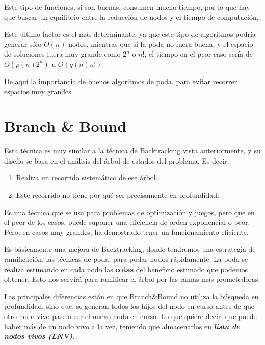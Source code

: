 \documentclass[10pt,a4paper,spanish]{report}
\theoremstyle{definition}
\theoremstyle{remark}
\begin{document}
Este tipo de funciones, si son buenas, consumen mucho tiempo, por lo que hay que buscar un equilibrio entre la reducción de nodos y el tiempo de computación.

Este último factor es el más determinante, ya que este tipo de algoritmos podría generar sólo $O(n)$ nodos, mientras que si la poda no fuera buena, y el espacio de soluciones fuera muy grande como $2^n$ o $n!$, el tiempo en el peor caso sería de $O(p(n)2^n)$ u $O(q(n)n!)$.

De aquí la importancia de buenos algoritmos de poda, para evitar recorrer espacios muy grandes.


\chapter{\textcolor{coquelicot}Branch \& \textcolor{coquelicot}Bound}
\label{branchandbound}

Esta técnica es muy similar a la técnica de \hyperref[backtracking]{Backtracking} vista anteriormente, y su diseño se basa en el análisis del árbol de estados del problema. Es decir:

\begin{enumerate}[---]
    \item Realiza un recorrido sistemático de ese árbol.
    \item Este recorrido no tiene por qué ser precisamente en profundidad.
\end{enumerate}

Es una técnica que se usa para problemas de optimización y juegos, pero que en el peor de los casos, puede suponer una eficiencia de orden exponencial o peor. Pero, en casos muy grandes, ha demostrado tener un funcionamiento eficiente.

Es básicamente una mejora de Backtracking, donde tendremos una \textcolor{coquelicot}{estrategia de ramificación}, las \textcolor{coquelicot}{técnicas de poda}, para podar nodos rápidamente. La poda se realiza estimando en cada nodo las \textbf{\textcolor{coquelicot}{cotas}} del beneficio estimado que podemos obtener. Esto nos servirá para ramificar el árbol por las ramas más prometedoras.

Las principales diferencias están en que Branch\&Bound no utiliza la búsqueda en profundidad, sino que, se generan todos los hijos del nodo en curso antes de que otro nodo vivo pase a ser el nuevo nodo en curso. Lo que quiere decir, que puede haber más de un nodo vivo a la vez, teniendo que almacenarlos en \textbf{\textit{\textcolor{coquelicot}{lista de nodos vivos (LNV)}}}.
\end{document}
